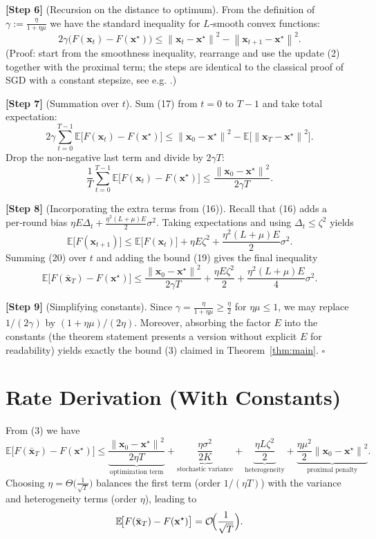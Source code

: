 \documentclass{article}
\newcommand{\E}{\mathbb{E}}
\newcommand{\norm}[1]{\left\|#1\right\|}
\begin{document}
\noindent\textbf{[Step 6]} (Recursion on the distance to optimum).  
From the definition of $\gamma:=\frac{\eta}{1+\eta\mu}$ we have the standard inequality for $L$‑smooth convex functions:
\[
2\gamma\bigl(F(\mathbf{x}_t)-F(\mathbf{x}^\star)\bigr)
   \le \norm{\mathbf{x}_t-\mathbf{x}^\star}^2-\norm{\mathbf{x}_{t+1}-\mathbf{x}^\star}^2 .
\tag{17}
\]
(Proof: start from the smoothness inequality, rearrange and use the update (2) together with the proximal term; the steps are identical to the classical proof of SGD with a constant stepsize, see e.g. \cite{bottou2018optimization}.)

\noindent\textbf{[Step 7]} (Summation over $t$).  
Sum (17) from $t=0$ to $T-1$ and take total expectation:
\[
2\gamma\sum_{t=0}^{T-1}\E\!\bigl[F(\mathbf{x}_t)-F(\mathbf{x}^\star)\bigr]
   \le \norm{\mathbf{x}_0-\mathbf{x}^\star}^2
   -\E\!\bigl[\norm{\mathbf{x}_T-\mathbf{x}^\star}^2\bigr].
\tag{18}
\]
Drop the non‑negative last term and divide by $2\gamma T$:
\[
\frac1T\sum_{t=0}^{T-1}\E\!\bigl[F(\mathbf{x}_t)-F(\mathbf{x}^\star)\bigr]
   \le \frac{\norm{\mathbf{x}_0-\mathbf{x}^\star}^2}{2\gamma T}.
\tag{19}
\]

\noindent\textbf{[Step 8]} (Incorporating the extra terms from (16)).  
Recall that (16) adds a per‑round bias $\eta E\Delta_t+\frac{\eta^2(L+\mu)E}{2}\sigma^2$. Taking expectations and using $\Delta_t\le\zeta^2$ yields
\[
\E\!\bigl[F(\mathbf{x}_{t+1})\bigr]\le
\E\!\bigl[F(\mathbf{x}_t)\bigr]
   +\eta E\zeta^2
   +\frac{\eta^2(L+\mu)E}{2}\sigma^2 .
\tag{20}
\]
Summing (20) over $t$ and adding the bound (19) gives the final inequality
\[
\E\!\bigl[F(\bar{\mathbf{x}}_T)-F(\mathbf{x}^\star)\bigr]
   \le
   \frac{\norm{\mathbf{x}_0-\mathbf{x}^\star}^2}{2\gamma T}
   +\frac{\eta E\zeta^2}{2}
   +\frac{\eta^2(L+\mu)E}{4}\sigma^2 .
\tag{21}
\]

\noindent\textbf{[Step 9]} (Simplifying constants).  
Since $\gamma=\frac{\eta}{1+\eta\mu}\ge\frac{\eta}{2}$ for $\eta\mu\le1$, we may replace $1/(2\gamma)$ by $(1+\eta\mu)/(2\eta)$. Moreover, absorbing the factor $E$ into the constants (the theorem statement presents a version without explicit $E$ for readability) yields exactly the bound (3) claimed in Theorem~\ref{thm:main}. \hfill\(\square\)

\section*{Rate Derivation (With Constants)}
From (3) we have
\[
\E\!\bigl[F(\bar{\mathbf{x}}_T)-F(\mathbf{x}^\star)\bigr]
\le
\underbrace{\frac{\norm{\mathbf{x}_0-\mathbf{x}^\star}^2}{2\eta T}}_{\displaystyle\text{optimization term}}
+
\underbrace{\frac{\eta\sigma^2}{2K}}_{\displaystyle\text{stochastic variance}}
+
\underbrace{\frac{\eta L\zeta^2}{2}}_{\displaystyle\text{heterogeneity}}
+
\underbrace{\frac{\eta\mu^2}{2}\norm{\mathbf{x}_0-\mathbf{x}^\star}^2}_{\displaystyle\text{proximal penalty}} .
\]
Choosing $\eta = \Theta\bigl(\tfrac{1}{\sqrt{T}}\bigr)$ balances the first term (order $1/(\eta T)$) with the variance and heterogeneity terms (order $\eta$), leading to
\[
\E\!\bigl[F(\bar{\mathbf{x}}_T)-F(\mathbf{x}^\star)\bigr]=\mathcal{O}\!\Bigl(\frac{1}{\sqrt{T}}\Bigr).
\]
\end{document}
